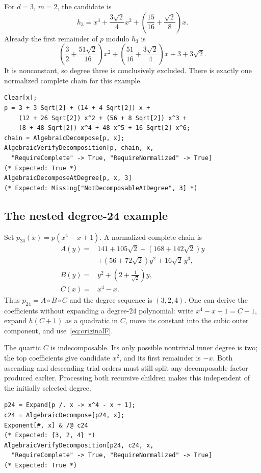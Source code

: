 \documentclass[11pt,letterpaper]{article}
\theoremstyle{definition}
\theoremstyle{remark}
\begin{document}
For $d=3$, $m=2$, the candidate is
\[
 h_3=x^3+\frac{3\sqrt2}{4}x^2+
          \left(\frac{15}{16}+\frac{\sqrt2}{8}\right)x.
\]
Already the first remainder of $p$ modulo $h_3$ is
\begin{equation}\label{eq:obstructionoriginal}
 \left(\frac32+\frac{51\sqrt2}{16}\right)x^2+
 \left(\frac{51}{16}+\frac{3\sqrt2}{4}\right)x+3+3\sqrt2.
\end{equation}
It is nonconstant, so degree three is conclusively excluded. There is
exactly one normalized complete chain for this example.

\begin{lstlisting}
Clear[x];
p = 3 + 3 Sqrt[2] + (14 + 4 Sqrt[2]) x +
    (12 + 26 Sqrt[2]) x^2 + (56 + 8 Sqrt[2]) x^3 +
    (8 + 48 Sqrt[2]) x^4 + 48 x^5 + 16 Sqrt[2] x^6;
chain = AlgebraicDecompose[p, x];
AlgebraicVerifyDecomposition[p, chain, x,
  "RequireComplete" -> True, "RequireNormalized" -> True]
(* Expected: True *)
AlgebraicDecomposeAtDegree[p, x, 3]
(* Expected: Missing["NotDecomposableAtDegree", 3] *)
\end{lstlisting}

\subsection{The nested degree-24 example}\label{sec:nested}
Set $p_{24}(x)=p(x^4-x+1)$. A normalized complete chain is
\begin{align*}
 A(y)={}&141+105\sqrt2+(168+142\sqrt2)y\\
       &+(56+72\sqrt2)y^2+16\sqrt2\,y^3,\\
 B(y)={}&y^2+\left(2+\frac1{\sqrt2}\right)y,\\
 C(x)={}&x^4-x.
\end{align*}
Thus $p_{24}=A\circ B\circ C$ and the degree sequence is $(3,2,4)$.
One can derive the coefficients without expanding a degree-24 polynomial:
write $x^4-x+1=C+1$, expand $h(C+1)$ as a quadratic in $C$, move its
constant into the cubic outer component, and use~\eqref{eq:originalF}.

The quartic $C$ is indecomposable. Its only possible nontrivial inner
degree is two; the top coefficients give candidate $x^2$, and its first
remainder is $-x$. Both ascending and descending trial orders must still
split any decomposable factor produced earlier. Processing both recursive
children makes this independent of the initially selected degree.

\begin{lstlisting}
p24 = Expand[p /. x -> x^4 - x + 1];
c24 = AlgebraicDecompose[p24, x];
Exponent[#, x] & /@ c24
(* Expected: {3, 2, 4} *)
AlgebraicVerifyDecomposition[p24, c24, x,
  "RequireComplete" -> True, "RequireNormalized" -> True]
(* Expected: True *)
\end{lstlisting}
\end{document}
